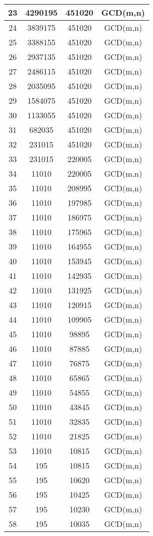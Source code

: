 \documentclass[a4paper,10pt]{article}
\begin{document}
\begin{longtable}{c|c|c|c}
23&4290195&451020&GCD(m,n)\\\hline
24&3839175&451020&GCD(m,n)\\\hline
25&3388155&451020&GCD(m,n)\\\hline
26&2937135&451020&GCD(m,n)\\\hline
27&2486115&451020&GCD(m,n)\\\hline
28&2035095&451020&GCD(m,n)\\\hline
29&1584075&451020&GCD(m,n)\\\hline
30&1133055&451020&GCD(m,n)\\\hline
31&682035&451020&GCD(m,n)\\\hline
32&231015&451020&GCD(m,n)\\\hline
33&231015&220005&GCD(m,n)\\\hline
34&11010&220005&GCD(m,n)\\\hline
35&11010&208995&GCD(m,n)\\\hline
36&11010&197985&GCD(m,n)\\\hline
37&11010&186975&GCD(m,n)\\\hline
38&11010&175965&GCD(m,n)\\\hline
39&11010&164955&GCD(m,n)\\\hline
40&11010&153945&GCD(m,n)\\\hline
41&11010&142935&GCD(m,n)\\\hline
42&11010&131925&GCD(m,n)\\\hline
43&11010&120915&GCD(m,n)\\\hline
44&11010&109905&GCD(m,n)\\\hline
45&11010&98895&GCD(m,n)\\\hline
46&11010&87885&GCD(m,n)\\\hline
47&11010&76875&GCD(m,n)\\\hline
48&11010&65865&GCD(m,n)\\\hline
49&11010&54855&GCD(m,n)\\\hline
50&11010&43845&GCD(m,n)\\\hline
51&11010&32835&GCD(m,n)\\\hline
52&11010&21825&GCD(m,n)\\\hline
53&11010&10815&GCD(m,n)\\\hline
54&195&10815&GCD(m,n)\\\hline
55&195&10620&GCD(m,n)\\\hline
56&195&10425&GCD(m,n)\\\hline
57&195&10230&GCD(m,n)\\\hline
58&195&10035&GCD(m,n)\\\hline

\end{longtable}
\end{document}
